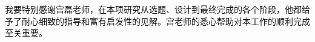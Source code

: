 
\begin{acknowledgements}
我要特别感谢宫磊老师，在本项研究从选题、设计到最终完成的各个阶段，他都给予了耐心细致的指导和富有启发性的见解。宫老师的悉心帮助对本工作的顺利完成至关重要。
\end{acknowledgements}
